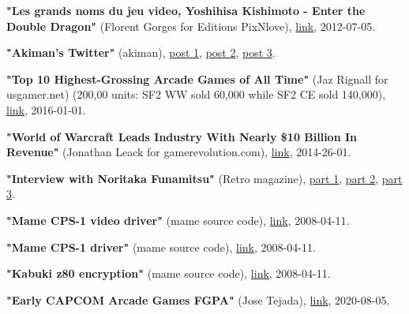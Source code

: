 \begin{thebibliography}{999}
  \textbf{ "Les grands noms du jeu video, Yoshihisa Kishimoto - Enter the Double Dragon"} (Florent Gorges for Editions PixNlove),
  \href{https://www.editionspixnlove.com/les-grands-noms-du-jeu-video/289-yoshihisa-kishimoto-enter-the-double-dragon.html}{link},
  2012-07-05.


  \textbf{ "Akiman's Twitter"} (akiman),
  \href{https://twitter.com/akiman7/status/465507673572519936}{post 1},
  \href{https://twitter.com/akiman7/status/309615270815731712}{post 2},
  \href{https://twitter.com/akiman7/status/386598518380453888}{post 3}.

  \textbf{ "Top 10 Highest-Grossing Arcade Games of All Time"} (Jaz Rignall for usgamer.net) (200,00 units: SF2 WW sold 60,000 while SF2 CE sold 140,000),
  \href{https://www.usgamer.net/articles/top-10-biggest-grossing-arcade-games-of-all-time}{link},
  2016-01-01.

  \textbf{ "World of Warcraft Leads Industry With Nearly \$10 Billion In Revenue"} (Jonathan Leack for gamerevolution.com),
  \href{https://www.gamerevolution.com/features/13510-world-of-warcraft-leads-industry-with-nearly-10-billion-in-revenue#/slide/1}{link},
  2014-26-01.
  
  \textbf{"Interview with Noritaka Funamitsu"} (Retro magazine),
  \href{http://fightingstreet.com/folders/variousinfofolder/interviewfolder/sfii_funamitsu/funamitsu1.jpg}{part 1},
  \href{http://fightingstreet.com/folders/variousinfofolder/interviewfolder/sfii_funamitsu/funamitsu2.jpg}{part 2},
  \href{http://fightingstreet.com/folders/variousinfofolder/interviewfolder/sfii_funamitsu/funamitsu3.jpg}{part 3}.

  \textbf{"Mame CPS-1 video driver"} (mame source code),
  \href{https://github.com/mamedev/mame/blob/e070405df99e6a5997d5a64ecd62e7161c729a9d/src/mame/video/cps1.cpp#L269}{link},
  2008-04-11.

  \textbf{"Mame CPS-1 driver"} (mame source code),
  \href{https://github.com/mamedev/mame/blob/e070405df99e6a5997d5a64ecd62e7161c729a9d/src/mame/drivers/cps1.cpp#L567}{link},
  2008-04-11.

  \textbf{"Kabuki z80 encryption"} (mame source code),
  \href{https://github.com/mamedev/historic-mame/blob/master/src/mame/machine/kabuki.c}{link},
  2008-04-11.


  \textbf{"Early CAPCOM Arcade Games FGPA"} (Jose Tejada),
  \href{https://github.com/jotego/jt_gng/blob/fb92e5ac0f72323638974034ad652649b6efafcb/README.md}{link},
  2020-08-05.


\end{thebibliography}
